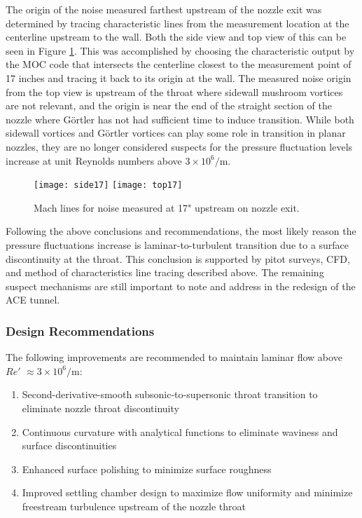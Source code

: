 The origin of the noise measured farthest upstream of the nozzle exit was determined by tracing characteristic lines from the measurement location at the centerline upstream to the wall. Both the side view and top view of this can be seen in Figure \ref{fig:machlines}. This was accomplished by choosing the characteristic output by the MOC code that intersects the centerline closest to the measurement point of 17 inches and tracing it back to its origin at the wall. The measured noise origin from the top view is upstream of the throat where sidewall mushroom vortices are not relevant, and the origin is near the end of the straight section of the nozzle where Görtler has not had sufficient time to induce transition. While both sidewall vortices and Görtler vortices can play some role in transition in planar nozzles, they are no longer considered suspects for the pressure fluctuation levels increase at unit Reynolds numbers above $3 \times 10^6/\mathrm{m}$.

\begin{figure}[ht!]
    \centering
    \texttt{[image: side17]}
    \texttt{[image: top17]}
    \caption{Mach lines for noise measured at 17" upstream on nozzle exit.}
    \label{fig:machlines}
\end{figure}

Following the above conclusions and recommendations, the most likely reason the pressure fluctuations increase is laminar-to-turbulent transition due to a surface discontinuity at the throat. This conclusion is supported by pitot surveys, CFD, and method of characteristics line tracing described above. The remaining suspect mechanisms are still important to note and address in the redesign of the ACE tunnel. 

\subsubsection*{Design Recommendations}

The following improvements are recommended to maintain laminar flow above $Re'$ $\approx 3 \times 10^6/\mathrm{m}$:
\begin{enumerate}
    \item Second-derivative-smooth subsonic-to-supersonic throat transition to eliminate nozzle throat discontinuity
    \item Continuous curvature with analytical functions to eliminate waviness and surface discontinuities
    \item Enhanced surface polishing to minimize surface roughness
    \item Improved settling chamber design to maximize flow uniformity and minimize freestream turbulence upstream of the nozzle throat
\end{enumerate}

